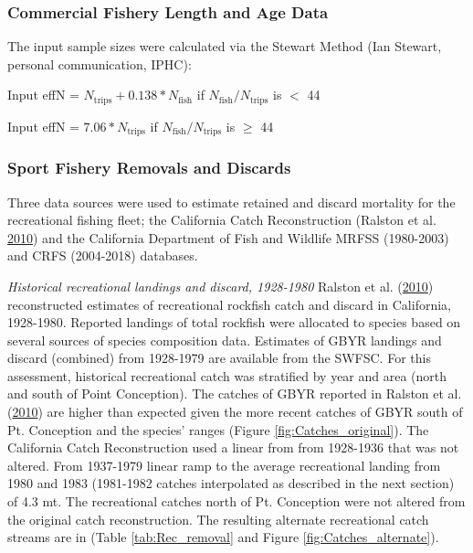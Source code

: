 \documentclass[12pt,]{article}
\begin{document}
\subsubsection{Commercial Fishery Length and Age
Data}\label{commercial-fishery-length-and-age-data}

The input sample sizes were calculated via the Stewart Method (Ian
Stewart, personal communication, IPHC):

\begin{centering}

Input effN = $N_{\text{trips}} + 0.138 * N_{\text{fish}}$ if $N_{\text{fish}}/N_{\text{trips}}$ is $<$ 44

Input effN = $7.06 * N_{\text{trips}}$ if $N_{\text{fish}}/N_{\text{trips}}$ is $\geq$ 44

\end{centering}

\subsubsection{Sport Fishery Removals and
Discards}\label{sport-fishery-removals-and-discards}

Three data sources were used to estimate retained and discard mortality
for the recreational fishing fleet; the California Catch Reconstruction
(Ralston et al. \protect\hyperlink{ref-Ralston2010}{2010}) and the
California Department of Fish and Wildlife MRFSS (1980-2003) and CRFS
(2004-2018) databases.

\emph{Historical recreational landings and discard, 1928-1980} Ralston
et al. (\protect\hyperlink{ref-Ralston2010}{2010}) reconstructed
estimates of recreational rockfish catch and discard in California,
1928-1980. Reported landings of total rockfish were allocated to species
based on several sources of species composition data. Estimates of GBYR
landings and discard (combined) from 1928-1979 are available from the
SWFSC. For this assessment, historical recreational catch was stratified
by year and area (north and south of Point Conception). The catches of
GBYR reported in Ralston et al.
(\protect\hyperlink{ref-Ralston2010}{2010}) are higher than expected
given the more recent catches of GBYR south of Pt. Conception and the
species' ranges (Figure \ref{fig:Catches_original}). The California
Catch Reconstruction used a linear from from 1928-1936 that was not
altered. From 1937-1979 linear ramp to the average recreational landing
from 1980 and 1983 (1981-1982 catches interpolated as described in the
next section) of 4.3 mt. The recreational catches north of Pt.
Conception were not altered from the original catch reconstruction. The
resulting alternate recreational catch streams are in (Table
\ref{tab:Rec_removal} and Figure \ref{fig:Catches_alternate}).
\end{document}
